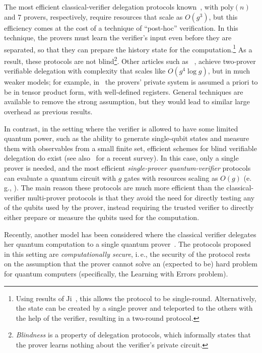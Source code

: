 \documentclass[11pt]{article}
\numberwithin{equation}{section}
\theoremstyle{definition}
\theoremstyle{plain}
\newcommand{\ie}{i.\,e.}
\newcommand{\eg}{e.\,g.}
\begin{document}
The most efficient classical-verifier delegation protocols 
%
known~\cite{hajdusek2015posthoc-updated, FHM18, %
natarajan2016robust}, 
with $\mathrm{poly}(n)$ and 7 provers, respectively,
require resources that scale as $O(g^3)$, 
but this efficiency comes at the cost of a technique of ``post-hoc''
verification. In this technique, the provers must learn the
verifier's input even before they are separated, so that they can prepare the
history state for the computation.\footnote{Using results of Ji~\cite{Ji16},
this allows the protocol to be single-round. Alternatively, the state can be created by a single prover and teleported to the others with the help of the verifier, resulting in a two-round protocol.} As a result, these protocols are not blind\footnote{
\emph{Blindness} is a property of delegation protocols, which informally states that the prover learns nothing about the verifier's private circuit.}. 
Other %
articles  %
such as ~\cite{HayashiH16},
achieve two-prover verifiable delegation with complexity that scales like $O(g^4\log g)$,  but in much weaker models; for example, in~\cite{HayashiH16} the provers' private system is assumed a priori to be in tensor product form, with well-defined registers.  General techniques are available to remove the strong assumption, but they would lead to similar large overhead as previous results.

In contrast, in the setting where the verifier is allowed to have some limited quantum power, such as the ability to generate single-qubit states and measure them with observables from a small finite set, efficient schemes for blind verifiable delegation do exist \cite{aharonov10qpip,fitzsimons12vubqc,Morimae14,broadbent15howtoverify,HayashiM15,%
MF16a,FHM18,  %
FujiiH17, MorimaeTH17}
(see also~\cite{fitzsimons2016survey} for a recent survey). In this case, only a single prover is needed, and the most efficient \emph{single-prover quantum-verifier} protocols can evaluate a quantum circuit with $g$ gates with resources scaling as $O(g)$ (\eg, \cite{broadbent15howtoverify}). The main reason these protocols are much more efficient than the classical-verifier multi-prover protocols is that they avoid the need for directly testing any of the qubits used by the prover, instead requiring the trusted verifier to directly either prepare or measure the qubits used for the computation. 


Recently, another model has been considered where the classical verifier delegates her quantum computation to a single quantum prover~\cite{mahadev2018,GheorghiuV19}. The protocols proposed in this setting are \emph{computationally secure}, \ie, the security of the protocol rests on the assumption that the prover cannot solve an (expected to be) hard problem for quantum computers (specifically, the Learning with Errors problem). 
\end{document}
